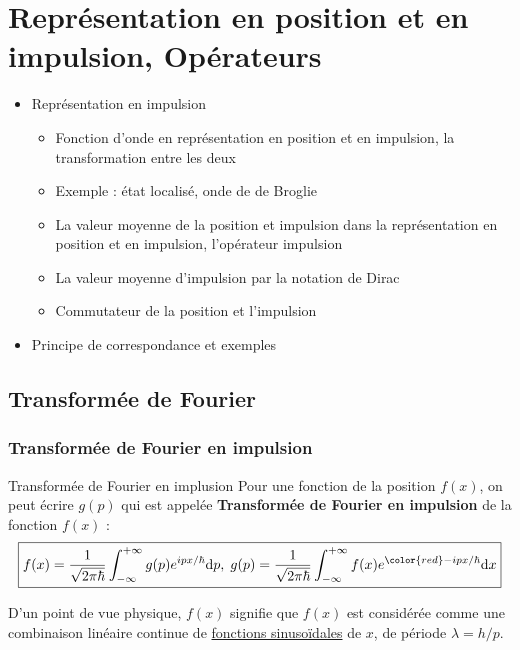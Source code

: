 \chapter{Représentation en position et en impulsion, Opérateurs}

\begin{tcolorbox}
  \begin{itemize}

    \item Représentation en impulsion
    \begin{itemize}

        \item Fonction d’onde en représentation en position et en impulsion, la transformation entre les deux 
        \item Exemple : état localisé, onde de de Broglie 
        \item La valeur moyenne de la position et impulsion dans la représentation en position et en impulsion, l’opérateur impulsion 
        \item La valeur moyenne d’impulsion par la notation de Dirac 
        \item Commutateur de la position et l’impulsion
    \end{itemize}
   \item Principe de correspondance et exemples

  \end{itemize}
\end{tcolorbox}
\section{Transformée de Fourier}
\subsection{Transformée de Fourier en impulsion}
\label{Transformée de Fourier}

\begin{Definition}[colbacktitle=red!75!black]{Transformée de Fourier en implusion}{}
Pour une fonction de la position $f(x)$, on peut écrire $g(p)$ qui est appelée \textbf{Transformée de Fourier en impulsion} de la fonction $f(x)$ :
  \[
    \boxed{f(x) = \frac{1}{\sqrt{2 \pi \hbar}} \int_{- \infty} ^{+ \infty} g(p) e ^{ipx / \hbar} \mathrm{d}p, \; g(p) = \frac{1}{\sqrt{2 \pi \hbar}} \int_{- \infty} ^{+ \infty} f(x)e ^{{\color{red} - }ipx / \hbar} \mathrm{d}x}
  \]

  D'un point de vue physique, $f(x)$ signifie que $f(x)$ est considérée comme une combinaison linéaire continue de \underline{fonctions sinusoïdales} de $x$, de période $\lambda = h/p$.
\end{Definition}

